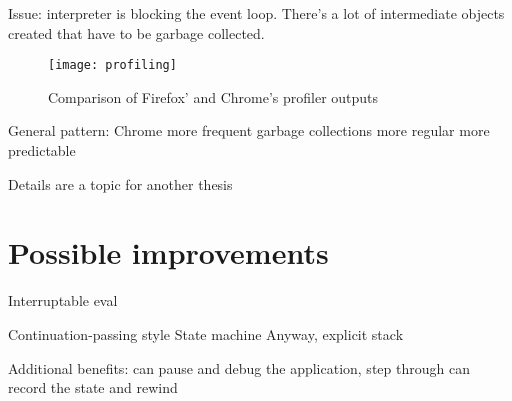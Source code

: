 Issue: interpreter is blocking the event loop.  There's a lot of intermediate
objects created that have to be garbage collected.

\begin{figure}[h!]
	\centering \texttt{[image: profiling]}
	\caption{Comparison of Firefox' and Chrome's profiler outputs}
	\label{fig:profiling}
\end{figure}

General pattern: Chrome more frequent garbage collections more regular more
predictable

Details are a topic for another thesis

\section{Possible improvements}
Interruptable eval

Continuation-passing style State machine Anyway, explicit stack

Additional benefits: can pause and debug the application, step through can
record the state and rewind
